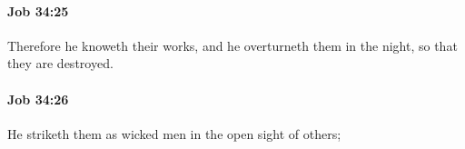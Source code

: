 		\paragraph{Job 34:25} %
			\label{JOB-34-25}

			Therefore he knoweth their works, and he overturneth them in the night, so that they are destroyed.


		\paragraph{Job 34:26} %
			\label{JOB-34-26}

			He striketh them as wicked men in the open sight of others;


